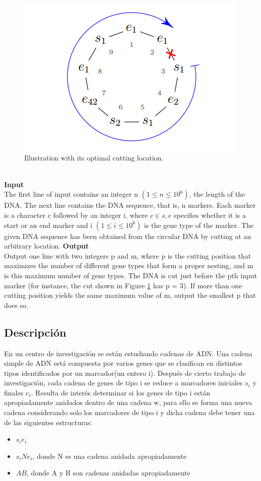 \documentclass{report}
\begin{document}
\begin{figure}[h]
	\begin{center}\includegraphics[scale=0.5]{DNA}\end{center}
	\caption{Illustration with its optimal cutting location.}	
	\label{DNA}
\end{figure}\\
{\bf Input}\\
The first line of input contains an integer n $(1 \leq n \leq 10^6)$, the length of the DNA. The next line
contains the DNA sequence, that is, n markers. Each marker is a character c followed by an integer i,
where $c \in {s, e}$ specifies whether it is a start or an end marker and i $(1 \leq i \leq 10^6)$ is the gene type of
the marker. The given DNA sequence has been obtained from the circular DNA by cutting at an arbitrary
location.
{\bf Output}\\
Output one line with two integers p and m, where p is the cutting position that maximizes the number
of different gene types that form a proper nesting, and m is this maximum number of gene types. The
DNA is cut just before the pth input marker (for instance, the cut shown in Figure \ref{DNA} has p = 3). If
more than one cutting position yields the same maximum value of m, output the smallest p that does so.

\subsection{Descripci\'on}
En un centro de investigaci\'on se est\'an estudiando cadenas de ADN. Una cadena simple de ADN est\'a compuesta por varios genes que se clasifican en distintos tipos identificados por un marcador(un entero i). Despu\'es de cierto trabajo de investigaci\'on, cada cadena de genes de tipo i se reduce a marcadores iniciales $s_i$ y finales $e_i$. Resulta de inter\'es determinar si los genes de tipo i est\'an apropiadamente anidados dentro de una cadena w, para ello se forma una nueva cadena considerando solo los marcadores de tipo i y dicha cadena debe tener una de las siguientes estructuras:\\
\begin{itemize}
	\item $s_ie_i$
	\item $s_iNe_i$, donde N es una cadena anidada apropiadamente
	\item $AB$, donde A y B son cadenas anidadas apropiadamente
	
\end{itemize}
\end{document}
